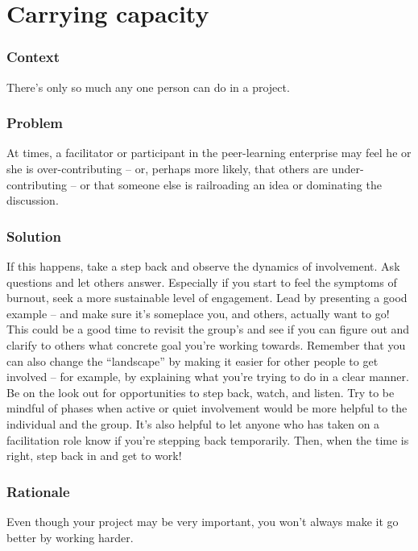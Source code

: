 \begingroup \color{BurntOrange}

\section{Carrying capacity}\label{sec:Carrying_capacity}
\subsubsection*{Context} There's only so much any one person can do in a project.

\subsubsection*{Problem} At times, a facilitator or participant in the
peer-learning enterprise may feel he or she is over-contributing -- or,
perhaps more likely, that others are under-contributing -- or that
someone else is railroading an idea or dominating the discussion.

\subsubsection*{Solution} If this happens, take a step back and observe the
dynamics of involvement. Ask questions and let others
answer. Especially if you start to feel the symptoms of burnout, seek
a more sustainable level of engagement.  Lead by presenting a good
example -- and make sure it's someplace you, and others, actually want
to go!  This could be a good time to revisit the group's
 and see if you can figure out and clarify to
others what concrete goal you're working towards. Remember that you
can also change the ``landscape'' by making it easier for other people
to get involved -- for example, by explaining what you're trying to do
in a clear manner.  Be on the look out for opportunities to step back,
watch, and listen.  Try to be mindful of phases when active or quiet
involvement would be more helpful to the individual and the group.
It's also helpful to let anyone who has taken on a facilitation role
know if you're stepping back temporarily.  Then, when the time is
right, step back in and get to work!

\subsubsection*{Rationale} Even though your project may be very important, you
won't always make it go better by working harder.


